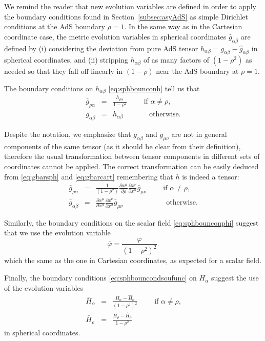 \documentclass[a4paper,11pt]{article}
\numberwithin{equation}{section}
\begin{document}
We remind the reader that new evolution variables are defined in order to apply the boundary conditions found in Section~\ref{subsec:asyAdS} as simple Dirichlet conditions at the AdS boundary $\rho=1$. In the same way as in the Cartesian coordinate case, the metric evolution variables in spherical coordinates $\bar{g}_{\alpha\beta}$ are defined by (i) considering the deviation from pure AdS tensor $h_{\alpha\beta}=g_{\alpha\beta}-\hat{g}_{\alpha\beta}$ in spherical coordinates, and (ii) stripping $h_{\alpha\beta}$ of as many factors of $(1-\rho^2)$ as needed so that they fall off linearly in $(1-\rho)$ near the AdS boundary at $\rho=1$.

The boundary conditions on $h_{\alpha\beta}$ \eqref{eq:sphbounconh} tell us that
\begin{eqnarray}\label{eq:gbarsph}
\bar{g}_{\rho\alpha}&=&\frac{h_{\rho\alpha} }{1-\rho^2}\qquad \textrm{ if $\alpha\neq\rho$}, \\ \nonumber
\bar{g}_{\alpha\beta}&=&h_{\alpha\beta} \qquad\;\;\;\;\, \textrm{ otherwise}.
\end{eqnarray}

Despite the notation, we emphasize that $\bar{g}_{\alpha\beta}$ and $\bar{g}_{\mu\nu}$ are not in general components of the same tensor (as it should be clear from their definition), therefore the usual transformation between tensor components in different sets of coordinates cannot be applied. The correct transformation can be easily deduced from \eqref{eq:gbarsph} and \eqref{eq:gbarcart} remembering that $h$ is indeed a tensor: 
\begin{eqnarray}\label{eq:cartosph}
\bar{g}_{\rho\alpha}&=&\frac{1}{(1-\rho^2)}\frac{\partial x^\mu}{\partial \rho}\frac{\partial x^\nu}{\partial x^\alpha}\bar{g}_{\mu\nu}\qquad \textrm{ if $\alpha\neq\rho$}, \\ \nonumber
\bar{g}_{\alpha\beta}&=&\frac{\partial x^\mu}{\partial x^\alpha}\frac{\partial x^\nu}{\partial x^\beta}\bar{g}_{\mu\nu}\qquad\qquad \;\;\;\;\;\; \textrm{ otherwise}.
\end{eqnarray}

Similarly, the boundary conditions on the scalar field \eqref{eq:sphbounconphi} suggest that we use the evolution variable
\begin{equation}
\bar{\varphi}=\frac{\varphi }{(1-\rho^2)^2}.
\end{equation}
which the same as the one in Cartesian coordinates, as expected for a scalar field.

Finally, the boundary conditions \eqref{eq:sphbouncondsoufunc} on $H_\alpha$ suggest the use of the evolution variables
\begin{eqnarray}
 \bar{H}_\alpha&=&\frac{H_\alpha-\hat{H}_\alpha}{(1-\rho^2)^2 } \qquad \textrm{ if $\alpha\neq\rho$,} \\ \nonumber
 \bar{H}_\rho&=&\frac{H_\rho-\hat{H}_\rho}{1-\rho^2 }
 \end{eqnarray}
in spherical coordinates.
\end{document}
